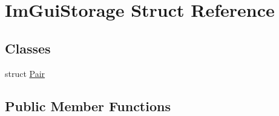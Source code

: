 \hypertarget{struct_im_gui_storage}{}\section{Im\+Gui\+Storage Struct Reference}
\label{struct_im_gui_storage}
\subsection*{Classes}
\begin{DoxyCompactItemize}
\item 
struct \mbox{\hyperlink{struct_im_gui_storage_1_1_pair}{Pair}}
\end{DoxyCompactItemize}
\subsection*{Public Member Functions}

